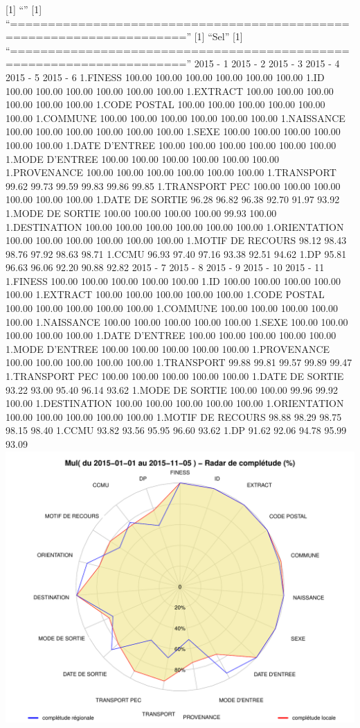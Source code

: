 \documentclass[]{article}
\begin{document}
{[}1{]} ``'' {[}1{]}
``=====================================================================''
{[}1{]} ``Sel'' {[}1{]}
``=====================================================================''
2015 - 1 2015 - 2 2015 - 3 2015 - 4 2015 - 5 2015 - 6 1.FINESS 100.00
100.00 100.00 100.00 100.00 100.00 1.ID 100.00 100.00 100.00 100.00
100.00 100.00 1.EXTRACT 100.00 100.00 100.00 100.00 100.00 100.00 1.CODE
POSTAL 100.00 100.00 100.00 100.00 100.00 100.00 1.COMMUNE 100.00 100.00
100.00 100.00 100.00 100.00 1.NAISSANCE 100.00 100.00 100.00 100.00
100.00 100.00 1.SEXE 100.00 100.00 100.00 100.00 100.00 100.00 1.DATE
D'ENTREE 100.00 100.00 100.00 100.00 100.00 100.00 1.MODE D'ENTREE
100.00 100.00 100.00 100.00 100.00 100.00 1.PROVENANCE 100.00 100.00
100.00 100.00 100.00 100.00 1.TRANSPORT 99.62 99.73 99.59 99.83 99.86
99.85 1.TRANSPORT PEC 100.00 100.00 100.00 100.00 100.00 100.00 1.DATE
DE SORTIE 96.28 96.82 96.38 92.70 91.97 93.92 1.MODE DE SORTIE 100.00
100.00 100.00 100.00 99.93 100.00 1.DESTINATION 100.00 100.00 100.00
100.00 100.00 100.00 1.ORIENTATION 100.00 100.00 100.00 100.00 100.00
100.00 1.MOTIF DE RECOURS 98.12 98.43 98.76 97.92 98.63 98.71 1.CCMU
96.93 97.40 97.16 93.38 92.51 94.62 1.DP 95.81 96.63 96.06 92.20 90.88
92.82 2015 - 7 2015 - 8 2015 - 9 2015 - 10 2015 - 11 1.FINESS 100.00
100.00 100.00 100.00 100.00 1.ID 100.00 100.00 100.00 100.00 100.00
1.EXTRACT 100.00 100.00 100.00 100.00 100.00 1.CODE POSTAL 100.00 100.00
100.00 100.00 100.00 1.COMMUNE 100.00 100.00 100.00 100.00 100.00
1.NAISSANCE 100.00 100.00 100.00 100.00 100.00 1.SEXE 100.00 100.00
100.00 100.00 100.00 1.DATE D'ENTREE 100.00 100.00 100.00 100.00 100.00
1.MODE D'ENTREE 100.00 100.00 100.00 100.00 100.00 1.PROVENANCE 100.00
100.00 100.00 100.00 100.00 1.TRANSPORT 99.88 99.81 99.57 99.89 99.47
1.TRANSPORT PEC 100.00 100.00 100.00 100.00 100.00 1.DATE DE SORTIE
93.22 93.00 95.40 96.14 93.62 1.MODE DE SORTIE 100.00 100.00 99.96 99.92
100.00 1.DESTINATION 100.00 100.00 100.00 100.00 100.00 1.ORIENTATION
100.00 100.00 100.00 100.00 100.00 1.MOTIF DE RECOURS 98.88 98.29 98.75
98.15 98.40 1.CCMU 93.82 93.56 95.95 96.60 93.62 1.DP 91.62 92.06 94.78
95.99 93.09 \includegraphics{completude_files/figure-latex/finess-3.pdf}
\end{document}

